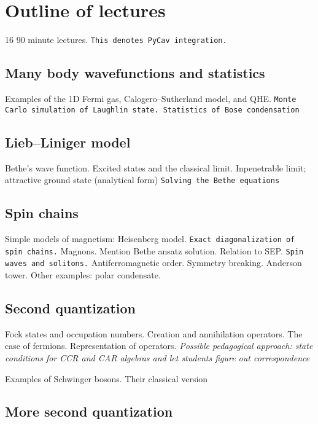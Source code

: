 \section{Outline of lectures}

16 90 minute lectures. \verb|This denotes PyCav integration.|

\subsection{Many body wavefunctions and statistics}

Examples of the 1D Fermi gas, Calogero--Sutherland model, and QHE. \verb|Monte Carlo simulation of Laughlin state. Statistics of Bose condensation|

\subsection{Lieb--Liniger model}

Bethe's wave function. Excited states and the classical limit. Inpenetrable limit; attractive ground state (analytical form) \verb|Solving the Bethe equations|

\subsection{Spin chains}

Simple models of magnetism: Heisenberg model. \verb|Exact diagonalization of spin chains.| Magnons. Mention Bethe ansatz solution. Relation to SEP. \verb|Spin waves and solitons.|
Antiferromagnetic order. Symmetry breaking. Anderson tower. Other examples: polar condensate.

\subsection{Second quantization}

Fock states and occupation numbers. Creation and annihilation operators. The case of fermions. Representation of operators. \textit{Possible pedagogical approach: state conditions for CCR and CAR algebras and let students figure out correspondence}

Examples of Schwinger bosons. Their classical version

\subsection{More second quantization}

